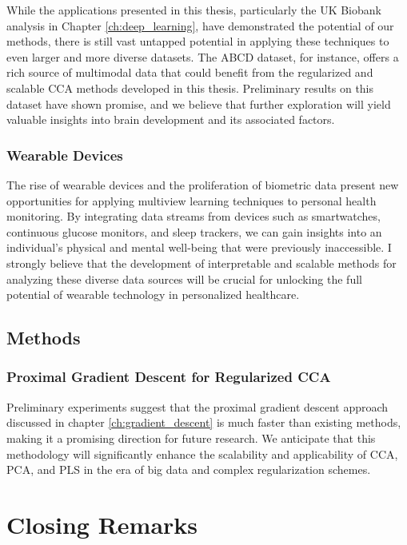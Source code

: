 While the applications presented in this thesis, particularly the UK Biobank analysis in Chapter \ref{ch:deep_learning}, have demonstrated the potential of our methods, there is still vast untapped potential in applying these techniques to even larger and more diverse datasets. The ABCD dataset, for instance, offers a rich source of multimodal data that could benefit from the regularized and scalable CCA methods developed in this thesis. Preliminary results on this dataset have shown promise, and we believe that further exploration will yield valuable insights into brain development and its associated factors.

\subsubsection{Wearable Devices}

The rise of wearable devices and the proliferation of biometric data present new opportunities for applying multiview learning techniques to personal health monitoring. By integrating data streams from devices such as smartwatches, continuous glucose monitors, and sleep trackers, we can gain insights into an individual's physical and mental well-being that were previously inaccessible. I strongly believe that the development of interpretable and scalable methods for analyzing these diverse data sources will be crucial for unlocking the full potential of wearable technology in personalized healthcare.

\subsection{Methods}

\subsubsection{Proximal Gradient Descent for Regularized CCA}

Preliminary experiments suggest that the proximal gradient descent approach discussed in chapter \ref{ch:gradient_descent} is much faster than existing methods, making it a promising direction for future research. We anticipate that this methodology will significantly enhance the scalability and applicability of CCA, PCA, and PLS in the era of big data and complex regularization schemes.

\section{Closing Remarks}

